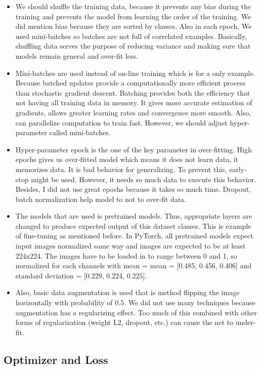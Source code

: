 \begin{itemize}
\item We should shuffle the training data, because it prevents any bias during the training and prevents the model from learning the order of the training. We did mention bias because they are sorted by classes. Also in each epoch, We used mini-batches so batches are not full of correlated examples. Basically, shuffling data serves the purpose of reducing variance and making sure that models remain general and over-fit less.
\item Mini-batches are used instead of on-line training which is for a only example. Because batched updates provide a computationally more efficient process than stochastic gradient descent. Batching provides both the efficiency that not having all training data in memory. It gives more accurate estimation of gradients, allows greater learning rates and convergence more smooth. Also, can parallelize computation to train fast. However, we should adjust hyper-parameter called mini-batches.  
\item  Hyper-parameter epoch is the one of the key parameter in over-fitting. High epochs gives us over-fitted model which means it does not learn data, it memorizes data. It is bad behavior for generalizing. To prevent this, early-stop might be used. However, it needs so much data to execute this behavior. Besides, I did not use great epochs because it takes so much time. Dropout, batch normalization help model to not to over-fit data.
\item The models that are used is pretrained models. Thus, appropriate layers are changed to produce expected output of this dataset classes. This is example of fine-tuning as mentioned before. In PyTorch, all pretrained models expect input images normalized same way and images are expected to be at least 224x224. The images have to be loaded in to range between 0 and 1, so normalized for each channels with mean = mean = [0.485, 0.456, 0.406] and standard deviation = [0.229, 0.224, 0.225].
\item Also, basic data augmentation is used that is method flipping the image horizontally with probability of 0.5. We did not use many techniques because augmentation has a regularizing effect. Too much of this combined with other forms of regularization (weight L2, dropout, etc.) can cause the net to under-fit.
\end{itemize}
\subsection{Optimizer and Loss}
